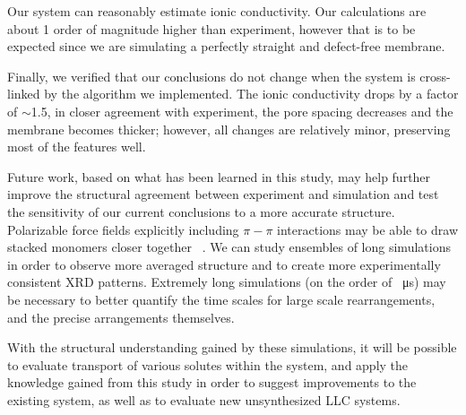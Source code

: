 \documentclass[journal=jpcbfk,manuscript=article]{achemso}
\begin{document}

  Our system can reasonably estimate ionic conductivity. Our
  calculations are about 1 order of magnitude higher than experiment, however
  that is to be expected since we are simulating a perfectly straight and
  defect-free membrane. 

  Finally, we verified that our conclusions do not change when the system is
  cross-linked by the algorithm we implemented. The ionic conductivity drops by a factor
  of $\sim$1.5, in closer agreement with experiment, the pore spacing decreases and
  the membrane becomes thicker; however, all changes are relatively minor, 
  preserving most of the features well.

  Future work, based on what has been learned in this study, may help further
  improve the structural agreement between experiment and simulation and test
  the sensitivity of our current conclusions to a more accurate structure. 
  Polarizable force fields explicitly including $\pi-\pi$ interactions may be
  able to draw stacked monomers closer together 
  ~\cite{shi_polarizable_2013,kaminski_development_2004,lopes_polarizable_2007}. 
  We can study ensembles of long simulations in order
  to observe more averaged structure and to create more experimentally consistent
  XRD patterns. Extremely long simulations (on the order of \SI{}{\micro s}) may
  be necessary to better quantify the time scales for large scale rearrangements,
  and the precise arrangements themselves.

  With the structural understanding gained by these simulations, it will be
  possible to evaluate transport of various solutes within the system, and apply the
  knowledge gained from this study in order to suggest improvements to the
  existing system, as well as to evaluate new unsynthesized LLC systems.
\end{document}

